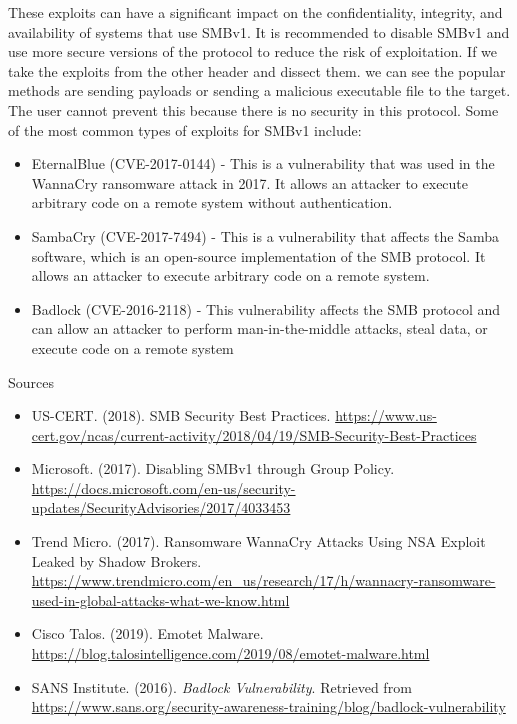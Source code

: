 \documentclass[12pt, letterpaper]{article}
\begin{document}
These exploits can have a significant impact on the confidentiality, integrity, and availability of systems that use SMBv1. It is recommended to disable SMBv1 and use more secure versions of the protocol to reduce the risk of exploitation.
\hfill\break
If we take the exploits from the other header and dissect them. we can see the popular methods are sending payloads or sending a malicious executable file to the target. The user cannot prevent this because there is no security in this protocol.
\break
Some of the most common types of exploits for SMBv1 include: 
\begin{itemize}
\item EternalBlue (CVE-2017-0144) - This is a vulnerability that was used in the WannaCry ransomware attack in 2017. It allows an attacker to execute arbitrary code on a remote system without authentication.
\item SambaCry (CVE-2017-7494) - This is a vulnerability that affects the Samba software, which is an open-source implementation of the SMB protocol. It allows an attacker to execute arbitrary code on a remote system.
\item {Badlock (CVE-2016-2118)} - This vulnerability affects the SMB protocol and can allow an attacker to perform man-in-the-middle attacks, steal data, or execute code on a remote system
\end{itemize}

Sources
\begin{itemize}
\item US-CERT. (2018). SMB Security Best Practices. \url{https://www.us-cert.gov/ncas/current-activity/2018/04/19/SMB-Security-Best-Practices}
\item Microsoft. (2017). Disabling SMBv1 through Group Policy. \url{https://docs.microsoft.com/en-us/security-updates/SecurityAdvisories/2017/4033453}
\item Trend Micro. (2017). Ransomware WannaCry Attacks Using NSA Exploit Leaked by Shadow Brokers. \url{https://www.trendmicro.com/en_us/research/17/h/wannacry-ransomware-used-in-global-attacks-what-we-know.html}
\item Cisco Talos. (2019). Emotet Malware. \url{https://blog.talosintelligence.com/2019/08/emotet-malware.html}
\item SANS Institute. (2016). \textit{Badlock Vulnerability}. Retrieved from \url{https://www.sans.org/security-awareness-training/blog/badlock-vulnerability}
\end{itemize}
\newpage
\end{document}
